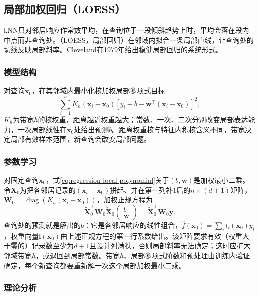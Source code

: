 \subsection{局部加权回归（LOESS）}
\label{sec:regression-loess}

kNN只对邻居响应作常数平均，在查询位于一段倾斜趋势上时，平均会落在段内中点而非查询处。（LOESS，局部回归）在邻域内拟合一条局部直线，让查询处的切线反映局部斜率。Cleveland在1979年给出稳健局部回归的系统形式。

\subsubsection{模型结构}
\label{sec:regression-loess-structure}

对查询$\bm{x}_0$，在其邻域内最小化核加权局部多项式目标
\begin{equation}
  \sum_{i=1}^n K_h(\bm{x}_i-\bm{x}_0)
    \left[y_i-b-\bm{w}^{\top}(\bm{x}_i-\bm{x}_0)\right]^2,
  \label{eq:regression-local-polynomial}
\end{equation}
$K_h$为带宽$h$的核权重，距离越近权重越大；常数、一次、二次分别改变局部表达能力，一次局部线性在$\bm{x}_0$处给出预测$b$。距离权重核与特征内积核含义不同，带宽决定局部有效样本范围，新查询会改变局部问题。

\subsubsection{参数学习}
\label{sec:regression-loess-learning}

对固定查询$\bm{x}_0$，式\eqref{eq:regression-local-polynomial}关于$(b,\bm{w})$是加权最小二乘。令$\widetilde{\bm{X}}_0$为把各邻居记录的$(\bm{x}_i-\bm{x}_0)$拼起、并在第一列补$1$后的$n\times(d+1)$矩阵，$\bm{W}_0=\operatorname{diag}(K_h(\bm{x}_i-\bm{x}_0))$，加权正规方程为
\[
  \widetilde{\bm{X}}_0^{\top}\bm{W}_0\widetilde{\bm{X}}_0
  \begin{pmatrix}b\\\bm{w}\end{pmatrix}
  =\widetilde{\bm{X}}_0^{\top}\bm{W}_0\bm{y}.
\]
查询处的预测就是解出的$b$：它是各邻居响应的线性组合，$\widehat f(\bm{x}_0)=\sum_i l_i(\bm{x}_0)y_i$，权重向量$\bm{l}(\bm{x}_0)$由上述正规方程的第一行系数给出。该矩阵要求有效（权重大于零的）记录数至少为$d+1$且设计列满秩，否则局部斜率无法确定；这时应扩大邻域带宽$h$，或退回到局部常数。带宽$h$、局部多项式阶数和预处理由训练内验证确定，每个新查询都要重新解一次这个局部加权最小二乘。

\subsubsection{理论分析}
\label{sec:regression-loess-theory}

